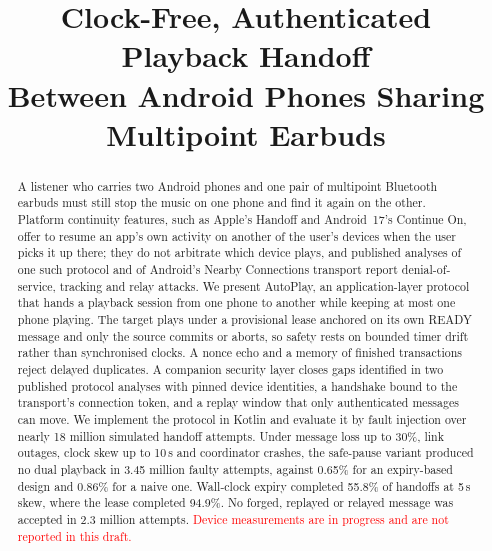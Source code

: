 \documentclass[conference]{IEEEtran}
\newcommand{\draftnote}[1]{\textcolor{red}{#1}}
\begin{document}
\title{Clock-Free, Authenticated Playback Handoff\\Between Android Phones Sharing Multipoint Earbuds}

\author{
}

\maketitle

\begin{abstract}
A listener who carries two Android phones and one pair of multipoint Bluetooth earbuds must still stop the music on one phone and find it again on the other. Platform continuity features, such as Apple's Handoff and Android~17's Continue On, offer to resume an app's own activity on another of the user's devices when the user picks it up there; they do not arbitrate which device plays, and published analyses of one such protocol and of Android's Nearby Connections transport report denial-of-service, tracking and relay attacks. We present AutoPlay, an application-layer protocol that hands a playback session from one phone to another while keeping at most one phone playing. The target plays under a provisional lease anchored on its own READY message and only the source commits or aborts, so safety rests on bounded timer drift rather than synchronised clocks. A nonce echo and a memory of finished transactions reject delayed duplicates. A companion security layer closes gaps identified in two published protocol analyses with pinned device identities, a handshake bound to the transport's connection token, and a replay window that only authenticated messages can move. We implement the protocol in Kotlin and evaluate it by fault injection over nearly 18 million simulated handoff attempts. Under message loss up to 30\%, link outages, clock skew up to 10\,s and coordinator crashes, the safe-pause variant produced no dual playback in 3.45 million faulty attempts, against 0.65\% for an expiry-based design and 0.86\% for a naive one. Wall-clock expiry completed 55.8\% of handoffs at 5\,s skew, where the lease completed 94.9\%. No forged, replayed or relayed message was accepted in 2.3 million attempts. \draftnote{Device measurements are in progress and are not reported in this draft.}
\end{abstract}
\end{document}
